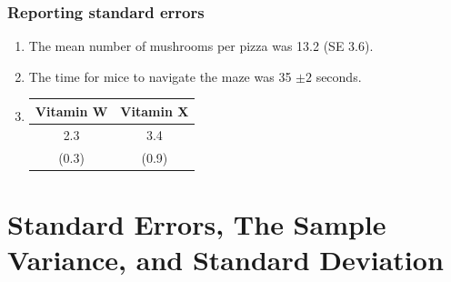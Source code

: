\documentclass[12pt, block=fill]{beamer}
\begin{document}
\begin{frame}
  \frametitle{Reporting standard errors}
\begin{enumerate}
\setlength\itemsep{1em}
\item The mean number of mushrooms per pizza was 13.2 (SE  3.6).
\item The time for mice to navigate the maze was 35 $\pm 2$ seconds.
\item \begin{tabular}{c | c}
Vitamin W & Vitamin X \\
\hline
2.3 & 3.4 \\
(0.3) & (0.9)
\end{tabular}
\end{enumerate}

\end{frame}



\section{Standard Errors, The Sample Variance, and Standard
  Deviation}
\end{document}
